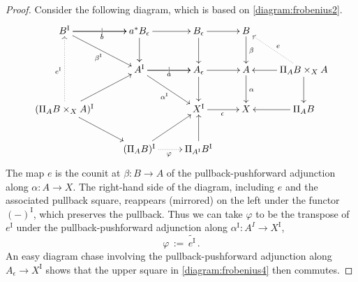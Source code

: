\documentclass[11pt]{amsart}
\newcommand{\ra}{\ensuremath{\rightarrow}}
\newcommand{\I}{\ensuremath{\mathrm{I}}}
\theoremstyle{remark}
\theoremstyle{definition}
\begin{document}
\begin{proof}
Consider the following diagram, which is based on \eqref{diagram:frobenius2}.
\begin{equation}\label{diagram:frobenius7}
\xymatrix{
B^\I \ar[r]|| \ar[r]_{b} \ar[rd]_{\beta^\I}  & a^*B_\epsilon \ar[r]  \ar[d]  & B_{\epsilon}  \ar[d]   \ar[r] & B \ar[d]^\beta & \\
& A^\I \ar[r]|| \ar[r]_{a}  \ar[rd]_{\alpha^\I}  & A_{\epsilon} \ar[d]   \ar[r] & A \ar[d]^\alpha &  \ar[d] \ar[l] \ar@{..>}[lu]_{e}\Pi_AB\times_{X} A\\
 (\Pi_AB \times_{X} A)^\I \ar@{..>}[uu]^{e^\I} \ar[ru] \ar[rd] && X^\I \ar[r]_{\epsilon} &  X &   \Pi_AB \ar[l]\\
& (\Pi_AB)^\I \ar[ru] \ar@{..>}[r]_\varphi  & \Pi_{A^\I}B^\I   \ar[u] & &
}
\end{equation}
The map $e$ is the counit at $\beta: B\ra A$ of the pullback-pushforward adjunction along $\alpha: A\ra X$. The right-hand side of the diagram, including $e$ and the associated pullback square, reappears (mirrored) on the left under the functor $(-)^\I$, which preserves the pullback. Thus we can take $\varphi$ to be the transpose of $e^\I$ under the pullback-pushforward adjunction along $\alpha^\I: A^I\ra X^\I$,
\[
\varphi\, :=\, \widetilde{e^\I}\,.
\]
An easy diagram chase involving the pullback-pushforward adjunction along $A_\epsilon\ra X^\I$ shows that the upper square in \eqref{diagram:frobenius4} then commutes.

%
\smallskip


\end{proof}
\end{document}
